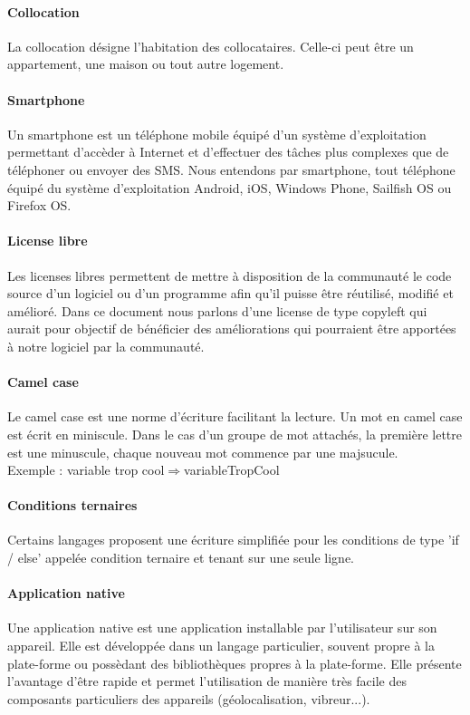 \paragraph{Collocation}
La collocation désigne l'habitation des collocataires. Celle-ci peut être un appartement, une maison ou tout autre logement.

\paragraph{Smartphone}
Un smartphone est un téléphone mobile équipé d'un système d'exploitation permettant d'accèder à Internet et d'effectuer des tâches plus complexes que de téléphoner ou envoyer des SMS. Nous entendons par smartphone, tout téléphone équipé du système d'exploitation Android, iOS, Windows Phone, Sailfish OS ou Firefox OS.

\paragraph{License libre}
Les licenses libres permettent de mettre à disposition de la communauté le code source d'un logiciel ou d'un programme afin qu'il puisse être réutilisé, modifié et amélioré. Dans ce document nous parlons d'une license de type copyleft qui aurait pour objectif de bénéficier des améliorations qui pourraient être apportées à notre logiciel par la communauté.

\paragraph{Camel case}
Le camel case est une norme d'écriture facilitant la lecture. Un mot en camel case est écrit en miniscule. Dans le cas d'un groupe de mot attachés, la première lettre est une minuscule, chaque nouveau mot commence par une majsucule.\\
Exemple : variable trop cool$ \Rightarrow $variableTropCool

\paragraph{Conditions ternaires}
Certains langages proposent une écriture simplifiée pour les conditions de type 'if / else' appelée condition ternaire et tenant sur une seule ligne.

\paragraph{Application native}
Une application native est une application installable par l'utilisateur sur son appareil. Elle est développée dans un langage particulier, souvent propre à la plate-forme ou possèdant des bibliothèques propres à la plate-forme. Elle présente l'avantage d'être rapide et permet l'utilisation de manière très facile des composants particuliers des appareils (géolocalisation, vibreur...).

